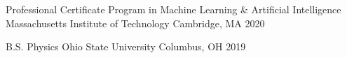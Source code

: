 
\begin{cventries}

    \blankcventry
    {Professional Certificate Program in Machine Learning \& Artificial Intelligence} %
    {Massachusetts Institute of Technology} %
    {Cambridge, MA} %
    {2020} %

    \blankcventry
    {B.S. Physics} %
    {Ohio State University} %
    {Columbus, OH} %
    {2019} %

\end{cventries}
